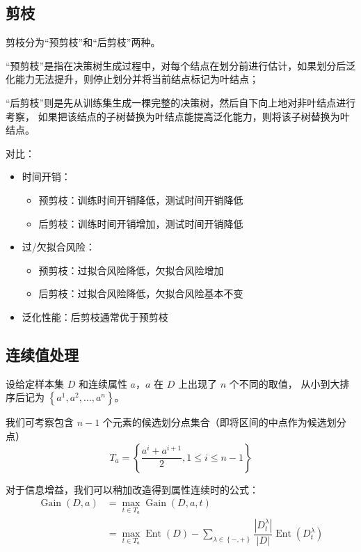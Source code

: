 \subsection{剪枝}
剪枝分为“预剪枝”和“后剪枝”两种。

“预剪枝”是指在决策树生成过程中，对每个结点在划分前进行估计，如果划分后泛化能力无法提升，则停止划分并将当前结点标记为叶结点；

“后剪枝”则是先从训练集生成一棵完整的决策树，然后自下向上地对非叶结点进行考察，
如果把该结点的子树替换为叶结点能提高泛化能力，则将该子树替换为叶结点。

对比：
\begin{itemize}
    \item 时间开销：
    \begin{itemize}
        \item 预剪枝：训练时间开销降低，测试时间开销降低
        \item 后剪枝：训练时间开销增加，测试时间开销降低
    \end{itemize}
    \item 过/欠拟合风险：
    \begin{itemize}
        \item 预剪枝：过拟合风险降低，欠拟合风险增加
        \item 后剪枝：过拟合风险降低，欠拟合风险基本不变
    \end{itemize}
    \item 泛化性能：后剪枝通常优于预剪枝
\end{itemize}

\subsection{连续值处理}
设给定样本集 $D$ 和连续属性 $a$，$a$ 在 $D$ 上出现了 $n$ 个不同的取值，
从小到大排序后记为 $\left\{a^1, a^2, \dots, a^n\right\}$。

我们可考察包含 $n - 1$ 个元素的候选划分点集合（即将区间的中点作为候选划分点）
\begin{equation}
    T_a = \left\{\dfrac{a^i + a^{i + 1}}{2}, 1 \leq i \leq n - 1\right\}
\end{equation}

对于信息增益，我们可以稍加改造得到属性连续时的公式：
\begin{equation}
    \begin{aligned}
        \operatorname{Gain}(D, a) &= \underset{t \in T_a}{\max} \operatorname{Gain}(D, a, t) \\
        &= \underset{t \in T_a}{\max} \operatorname{Ent}(D) - \sum\limits_{\lambda \in \left\{-, +\right\}}{\dfrac{|D_t^\lambda|}{|D|}\operatorname{Ent}(D_t^\lambda)}
        \end{aligned}
\end{equation}

